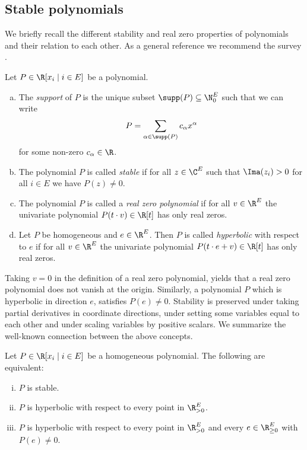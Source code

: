 \subsection{Stable polynomials}
We briefly recall the different stability and real zero properties of polynomials and their relation to each other. As a general reference we recommend the survey \cite{pemantle}.
\begin{Def}
    Let $P\in\R[x_i\mid i\in E]$ be a polynomial.
    \begin{enumerate}[(a)]
        \item The \emph{support} of $P$ is the unique subset $\supp(P)\subseteq\N_0^E$ such that we can write
        \begin{equation*}
            P=\sum_{\alpha\in\supp(P)}c_\alpha x^\alpha
        \end{equation*}
        for some non-zero $c_\alpha\in\R$.
        \item The polynomial $P$ is called \emph{stable} if for all $z\in\C^E$ such that $\Ima(z_i)>0$ for all $i\in E$ we have $P(z)\neq0$.
        \item The polynomial $P$ is called a \emph{real zero polynomial} if for all $v\in\R^E$ the univariate polynomial $P(t\cdot v)\in\R[t]$ has only real zeros.
        \item Let $P$ be homogeneous and $e\in\R^E$. Then $P$ is called \emph{hyperbolic} with respect to $e$ if for all $v\in\R^E$ the univariate polynomial $P(t\cdot e+v)\in\R[t]$ has only real zeros.
    \end{enumerate}
\end{Def}

Taking $v=0$ in the definition of a real zero polynomial, yields that a real zero polynomial does not vanish at the origin. Similarly, a polynomial $P$ which is hyperbolic in direction $e$, satisfies $P(e)\neq0$. Stability is preserved under taking partial derivatives in coordinate directions, under setting some variables equal to each other and under scaling variables by positive scalars. We summarize the well-known connection between the above concepts.

\begin{prop}\label{prop:stablehyp}
    Let $P\in\R[x_i\mid i\in E]$ be a homogeneous polynomial. The following are equivalent:
    \begin{enumerate}[(i)]
        \item $P$ is stable.
        \item $P$ is hyperbolic with respect to every point in $\R_{>0}^E$.
        \item $P$ is hyperbolic with respect to every point in $\R_{>0}^E$ and every $e\in\R_{\geq0}^E$ with $P(e)\neq0$.
    \end{enumerate}
\end{prop}

